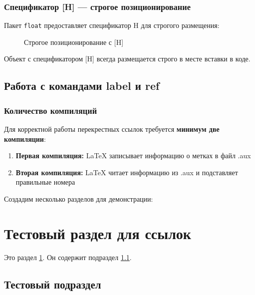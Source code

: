 \documentclass[12pt,a4paper]{article}
\begin{document}
\lipsum[5]

\subsubsection{Спецификатор [H] — строгое позиционирование}

Пакет \texttt{float} предоставляет спецификатор H для строгого размещения:

\begin{figure}[H]
\centering
{}
\caption{Строгое позиционирование с [H]}
\label{fig:float_H}
\end{figure}

Объект с спецификатором [H] всегда размещается строго в месте вставки в коде.

\lipsum[6]

\subsection{Работа с командами label и ref}

\subsubsection{Количество компиляций}

Для корректной работы перекрестных ссылок требуется \textbf{минимум две компиляции}:

\begin{enumerate}
    \item \textbf{Первая компиляция:} LaTeX записывает информацию о метках в файл .aux
    \item \textbf{Вторая компиляция:} LaTeX читает информацию из .aux и подставляет правильные номера
\end{enumerate}

Создадим несколько разделов для демонстрации:

\section{Тестовый раздел для ссылок}
\label{sec:test1}

Это раздел \ref{sec:test1}. Он содержит подраздел \ref{subsec:test1_1}.

\subsection{Тестовый подраздел}
\label{subsec:test1_1}
\end{document}
